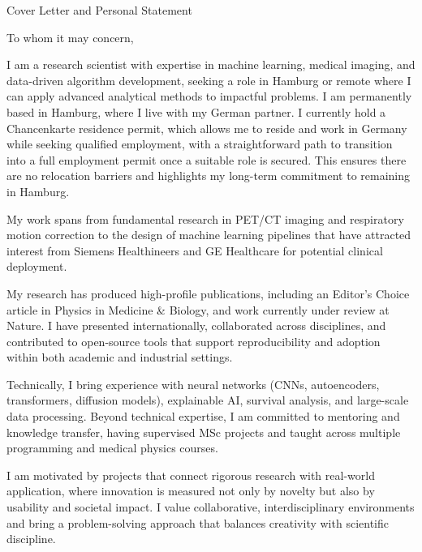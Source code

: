 \documentclass{cv}
\begin{document}
    \begin{spacing}{1.4}
        \begin{rSection}{Cover Letter and Personal Statement}
            \item To whom it may concern,

            \item I am a research scientist with expertise in machine learning, medical imaging, and data-driven algorithm development, seeking a role in Hamburg or remote where I can apply advanced analytical methods to impactful problems. I am permanently based in Hamburg, where I live with my German partner. I currently hold a Chancenkarte residence permit, which allows me to reside and work in Germany while seeking qualified employment, with a straightforward path to transition into a full employment permit once a suitable role is secured. This ensures there are no relocation barriers and highlights my long-term commitment to remaining in Hamburg.

            \item My work spans from fundamental research in PET/CT imaging and respiratory motion correction to the design of machine learning pipelines that have attracted interest from Siemens Healthineers and GE Healthcare for potential clinical deployment.

            \item My research has produced high-profile publications, including an Editor’s Choice article in Physics in Medicine \& Biology, and work currently under review at Nature. I have presented internationally, collaborated across disciplines, and contributed to open-source tools that support reproducibility and adoption within both academic and industrial settings.

            \item Technically, I bring experience with neural networks (CNNs, autoencoders, transformers, diffusion models), explainable AI, survival analysis, and large-scale data processing. Beyond technical expertise, I am committed to mentoring and knowledge transfer, having supervised MSc projects and taught across multiple programming and medical physics courses.

            \item I am motivated by projects that connect rigorous research with real-world application, where innovation is measured not only by novelty but also by usability and societal impact. I value collaborative, interdisciplinary environments and bring a problem-solving approach that balances creativity with scientific discipline.
            

\end{rSection}
\end{spacing}
\end{document}
